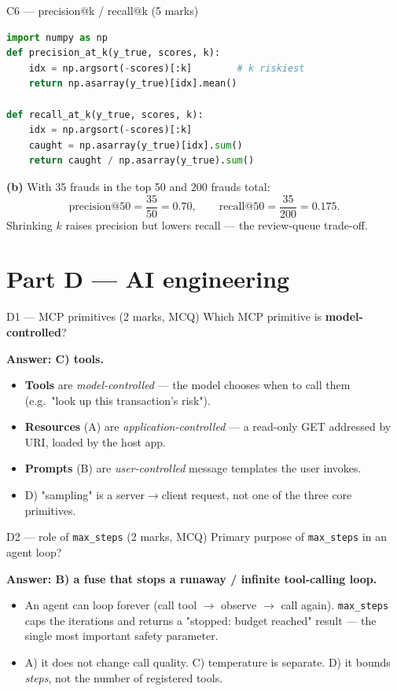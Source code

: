 \documentclass[aspectratio=169,11pt]{beamer}
\begin{document}
\begin{frame}[fragile]{C6 --- precision@k / recall@k \hfill (5 marks)}
\begin{lstlisting}[language=Python]
import numpy as np
def precision_at_k(y_true, scores, k):
    idx = np.argsort(-scores)[:k]        # k riskiest
    return np.asarray(y_true)[idx].mean()

def recall_at_k(y_true, scores, k):
    idx = np.argsort(-scores)[:k]
    caught = np.asarray(y_true)[idx].sum()
    return caught / np.asarray(y_true).sum()
\end{lstlisting}
\textbf{(b)} With 35 frauds in the top 50 and 200 frauds total:
\[
\text{precision@50} = \frac{35}{50} = 0.70,\qquad
\text{recall@50} = \frac{35}{200} = 0.175.
\]
\footnotesize Shrinking $k$ raises precision but lowers recall --- the review-queue trade-off.
\end{frame}

\section{Part D --- AI engineering}

\begin{frame}[fragile]{D1 --- MCP primitives \hfill (2 marks, MCQ)}
Which MCP primitive is \textbf{model-controlled}?
\medskip

\textbf{Answer: C) \textcolor{cgreen}{tools}.}
\begin{itemize}
  \item \textbf{Tools} are \emph{model-controlled} --- the model chooses when to call them (e.g.\ "look up this transaction's risk").
  \item \textbf{Resources} (A) are \emph{application-controlled} --- a read-only GET addressed by URI, loaded by the host app.
  \item \textbf{Prompts} (B) are \emph{user-controlled} message templates the user invokes.
  \item D) "sampling" is a server$\to$client request, not one of the three core primitives.
\end{itemize}
\end{frame}

\begin{frame}[fragile]{D2 --- role of \texttt{max\_steps} \hfill (2 marks, MCQ)}
Primary purpose of \texttt{max\_steps} in an agent loop?
\medskip

\textbf{Answer: B) \textcolor{cgreen}{a fuse that stops a runaway / infinite tool-calling loop}.}
\begin{itemize}
  \item An agent can loop forever (call tool $\to$ observe $\to$ call again). \texttt{max\_steps} caps the iterations and returns a "stopped: budget reached" result --- the single most important safety parameter.
  \item A) it does not change call quality. C) temperature is separate. D) it bounds \emph{steps}, not the number of registered tools.
\end{itemize}
\end{frame}
\end{document}
